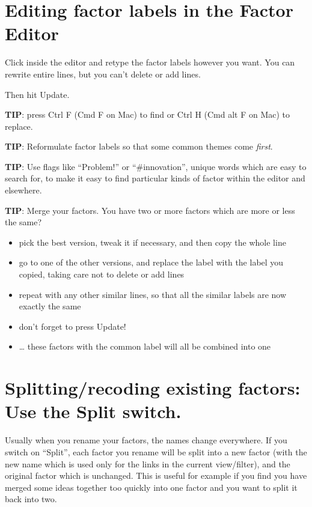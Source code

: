 \documentclass[
]{book}
\providecommand{\tightlist}{%
  \setlength{\itemsep}{0pt}\setlength{\parskip}{0pt}}
\begin{document}
\hypertarget{editing-factor-labels-in-the-factor-editor}{%
\section{Editing factor labels in the Factor Editor}\label{editing-factor-labels-in-the-factor-editor}}

Click inside the editor and retype the factor labels however you want. You can rewrite entire lines, but you can't delete or add lines.

Then hit Update.

\textbf{TIP}: press Ctrl F (Cmd F on Mac) to find or Ctrl H (Cmd alt F on Mac) to replace.

\textbf{TIP}: Reformulate factor labels so that some common themes come \emph{first}.

\textbf{TIP}: Use flags like ``Problem!'' or ``\#innovation'', unique words which are easy to search for, to make it easy to find particular kinds of factor within the editor and elsewhere.

\textbf{TIP}: Merge your factors. You have two or more factors which are more or less the same?

\begin{itemize}
\tightlist
\item
  pick the best version, tweak it if necessary, and then copy the whole line
\item
  go to one of the other versions, and replace the label with the label you copied, taking care not to delete or add lines
\item
  repeat with any other similar lines, so that all the similar labels are now exactly the same
\item
  don't forget to press Update!
\item
  \ldots{} these factors with the common label will all be combined into one
\end{itemize}

\hypertarget{splittingrecoding-existing-factors-use-the-split-switch.}{%
\section{\texorpdfstring{Splitting/recoding existing factors: Use the \textbf{Split} switch.}{Splitting/recoding existing factors: Use the Split switch.}}\label{splittingrecoding-existing-factors-use-the-split-switch.}}

Usually when you rename your factors, the names change everywhere. If you switch on ``Split'', each factor you rename will be split into a new factor (with the new name which is used only for the links in the current view/filter), and the original factor which is unchanged. This is useful for example if you find you have merged some ideas together too quickly into one factor and you want to split it back into two.
\end{document}

